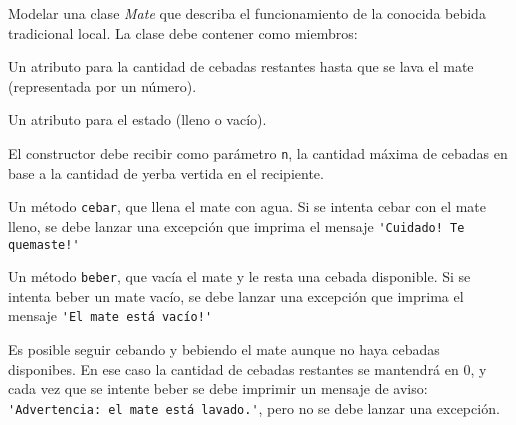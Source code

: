 \begin{ejercicio}
Modelar una clase {\it Mate} que describa el funcionamiento de la
conocida bebida tradicional local. La clase debe contener como miembros:
\begin{partes}
    \item Un atributo para la cantidad de cebadas restantes hasta que se lava
el mate (representada por un número).
    \item Un atributo para el estado (lleno o vacío).
    \item El constructor debe recibir como parámetro \verb!n!, la cantidad
máxima de cebadas en base a la cantidad de yerba vertida en el recipiente.
    \item Un método \verb!cebar!, que llena el mate con agua. Si se intenta
cebar con el mate lleno, se debe lanzar una excepción que imprima el
mensaje \lstinline|'Cuidado! Te quemaste!'|
    \item Un método \verb!beber!, que vacía el mate y le resta una cebada
disponible. Si se intenta beber un mate vacío, se debe lanzar una excepción
que imprima el mensaje \lstinline|'El mate está vacío!'|
    \item Es posible seguir cebando y bebiendo el mate aunque no haya cebadas
disponibes. En ese caso la cantidad de cebadas restantes se mantendrá
en 0, y cada vez que se intente beber se debe imprimir un mensaje de
aviso: \lstinline|'Advertencia: el mate está lavado.'|, pero no se debe lanzar una
excepción.
\end{partes}
\end{ejercicio}

